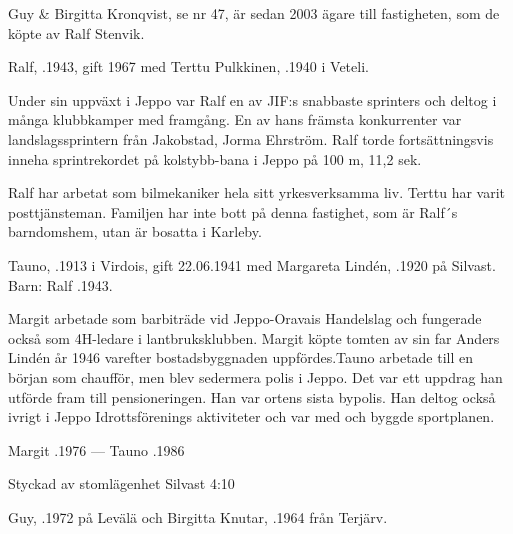 Guy \& Birgitta Kronqvist, se nr 47, är sedan 2003 ägare till fastigheten, som de köpte av Ralf Stenvik.


Ralf, .1943, gift 1967 med Terttu Pulkkinen, .1940 i Veteli.
\begin{jhchildren}
  \item {}
  \item {}
\end{jhchildren}
Under sin uppväxt i Jeppo var Ralf en av JIF:s snabbaste sprinters och deltog i många klubbkamper med framgång. En av hans främsta konkurrenter var landslagssprintern från Jakobstad, Jorma Ehrström. Ralf torde fortsättningsvis inneha sprintrekordet på kolstybb-bana i Jeppo på 100 m, 11,2 sek.

Ralf har arbetat som bilmekaniker hela sitt yrkesverksamma liv. Terttu har varit posttjänsteman. Familjen har inte bott på denna fastighet, som är Ralf´s barndomshem, utan är bosatta i Karleby.


Tauno, .1913 i Virdois, gift 22.06.1941 med  Margareta Lindén, .1920 på Silvast.
Barn: Ralf .1943.

Margit arbetade som barbiträde vid Jeppo-Oravais Handelslag och fungerade också som 4H-ledare i lantbruksklubben. Margit köpte tomten av sin far Anders Lindén år 1946 varefter bostadsbyggnaden uppfördes.Tauno arbetade till en början som chaufför, men blev sedermera polis i Jeppo. Det var ett uppdrag han utförde fram till pensioneringen. Han var ortens sista bypolis. Han deltog också ivrigt i Jeppo  Idrottsförenings aktiviteter och var med och byggde sportplanen.

Margit .1976  ---  Tauno .1986




Styckad av stomlägenhet Silvast 4:10


Guy, .1972 på Levälä och Birgitta Knutar, .1964 från Terjärv.
\begin{jhchildren}
  \item {}
\end{jhchildren}

